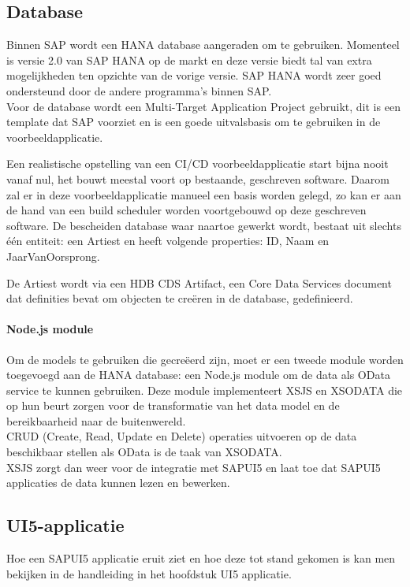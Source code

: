         \subsection{Database}
        Binnen SAP wordt een HANA database aangeraden om te gebruiken. Momenteel is versie 2.0 van SAP HANA op de markt en deze versie biedt tal van extra mogelijkheden ten opzichte van de vorige versie. SAP HANA wordt zeer goed ondersteund door de andere programma's binnen SAP.\\
        Voor de database wordt een Multi-Target Application Project gebruikt, dit is een template dat SAP voorziet en is een goede uitvalsbasis om te gebruiken in de voorbeeldapplicatie.
        
            
            Een realistische opstelling van een CI/CD voorbeeldapplicatie start bijna nooit vanaf nul, het bouwt meestal voort op bestaande, geschreven software.
            Daarom zal er in deze voorbeeldapplicatie manueel een basis worden gelegd, zo kan er aan de hand van een build scheduler worden voortgebouwd op deze geschreven software.
            De bescheiden database waar naartoe gewerkt wordt, bestaat uit slechts één entiteit: een Artiest en heeft volgende properties: ID, Naam en JaarVanOorsprong.
            
            De Artiest wordt via een HDB CDS Artifact, een Core Data Services document dat definities bevat om objecten te creëren in de database, gedefinieerd.
           
            \paragraph{Node.js module}
            Om de models te gebruiken die gecreëerd zijn, moet er een tweede module worden toegevoegd aan de HANA database: een Node.js module om de data als OData service te kunnen gebruiken.
            Deze module implementeert XSJS en XSODATA die op hun beurt zorgen voor de transformatie van het data model en de bereikbaarheid naar de buitenwereld.\\
            CRUD (Create, Read, Update en Delete) operaties uitvoeren op de data beschikbaar stellen als OData is de taak van XSODATA.\\
            XSJS zorgt dan weer voor de integratie met SAPUI5 en laat toe dat SAPUI5 applicaties de data kunnen lezen en bewerken.

            
        \subsection{UI5-applicatie}
        Hoe een SAPUI5 applicatie eruit ziet en hoe deze tot stand gekomen is kan men bekijken in de handleiding in het hoofdstuk UI5 applicatie.